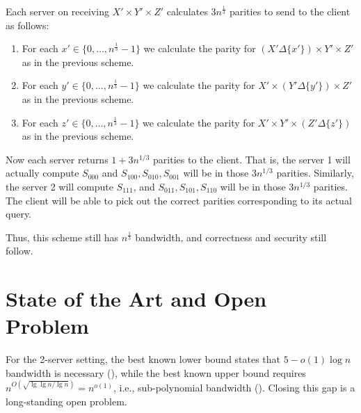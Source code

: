 Each server on receiving $X' \times Y' \times Z'$ calculates $3 n^{\frac1 3}$ parities to send to the client as follows:
\begin{enumerate}
	\item For each $x' \in \{0,\dots,n^{\frac 1 3} - 1\}$ we calculate the parity for $(X' \Delta \{x'\}) \times Y' \times  Z'$ as in the previous scheme.
	\item For each $y' \in \{0,\dots,n^{\frac 1 3} - 1\}$ we calculate the parity for $X' \times (Y' \Delta \{y'\}) \times  Z'$ as in the previous scheme.
	\item For each $z' \in \{0,\dots,n^{\frac 1 3} - 1\}$ we calculate the parity for $X' \times Y' \times  (Z' \Delta \{z'\})$ as in the previous scheme.
\end{enumerate}

Now each server returns $1+3n^{1/3}$ parities to the client.
That is, the server 1 will actually compute $S_{000}$ and $S_{100}, S_{010}, S_{001}$ will be in those $3n^{1/3}$ parities. 
Similarly, the server 2 will compute $S_{111}$, and $S_{011},S_{101},S_{110}$ will be in those $3n^{1/3}$ parities.
The client will be able to pick out the correct parities corresponding to its actual query.

Thus, this scheme still has $n^{\frac 1 3}$ bandwidth, and correctness and security still follow.

\section{State of the Art and Open Problem}
	For the 2-server setting, the best
known lower bound states that $5 - o(1)\log n$ bandwidth is necessary (\cite{WdW05}),  while the best known upper bound requires 
	$n^{O\left(\sqrt{\lg \lg n / \lg n}\right)} = n^{o(1)}$, i.e., 
sub-polynomial
bandwidth (\cite{dvir20162}). Closing this gap is a long-standing open problem. 


